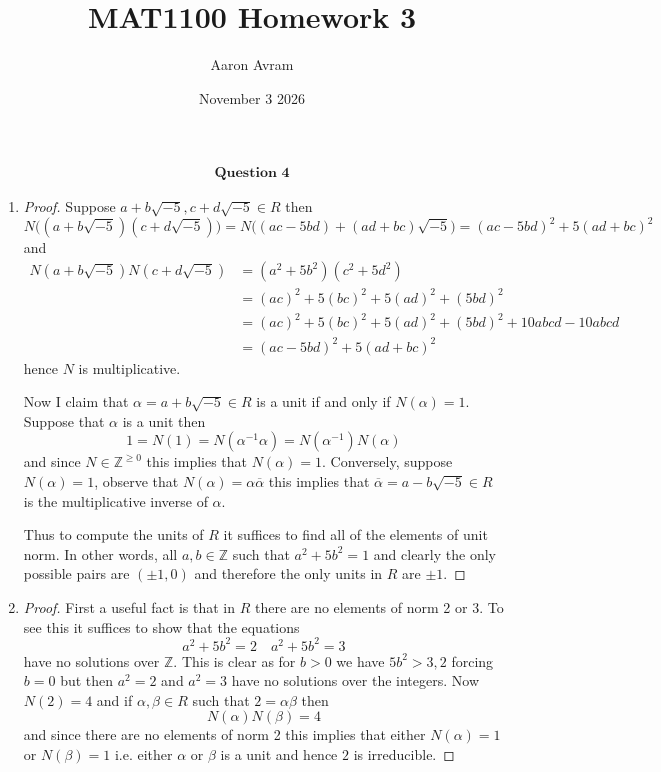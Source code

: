 \documentclass[12pt]{article}
\title{MAT1100 Homework 3}
\author{Aaron Avram}
\date{November 3 2026}
\begin{document}
\newtheorem{definition}{Definition}
\newtheorem{theorem}{Theorem}
\newtheorem{claim}{Claim}
\newtheorem{corollary}{Corollary}

\maketitle

\begin{align*}
    \textbf{Question 4}
\end{align*}

\begin{enumerate}
    \item[(a)]
    \begin{proof}
        Suppose $a + b\sqrt{-5}, c + d\sqrt{-5} \in R$ then
        \[ N\Big((a + b\sqrt{-5})(c + d\sqrt{-5})\Big) = N\Big((ac - 5bd) + (ad + bc)\sqrt{-5} \Big) = (ac - 5bd)^2 + 5(ad + bc)^2 \]
        and
        \begin{align*}
        N(a + b\sqrt{-5})N(c + d\sqrt{-5}) &= (a^2 + 5b^2)(c^2 + 5d^2) \\
        &= (ac)^2 + 5(bc)^2 + 5(ad)^2 + (5bd)^2 \\
        &= (ac)^2 + 5(bc)^2 + 5(ad)^2 + (5bd)^2 + 10abcd - 10abcd \\
        &= (ac -5bd)^2 + 5(ad + bc)^2
        \end{align*}
        hence $N$ is multiplicative.

        Now I claim that $\alpha = a + b\sqrt{-5} \in R$ is a unit if and only if $N(\alpha) = 1$.
        Suppose that $\alpha$ is a unit then
        \[ 1 = N(1) = N(\alpha^{-1}\alpha) = N(\alpha^{-1})N(\alpha) \]
        and since $N \in \mathbb Z^{\geq 0}$ this implies that $N(\alpha) = 1$.
        Conversely, suppose $N(\alpha) = 1$, observe that $N(\alpha) = \alpha\overline{\alpha}$
        this implies that $\overline{\alpha} = a - b\sqrt{-5} \in R$ is the multiplicative inverse of $\alpha$.

        Thus to compute the units of $R$ it suffices to find all of the elements of unit norm.
        In other words, all $a, b \in \mathbb Z$ such that $a^2 + 5b^2 = 1$ and clearly
        the only possible pairs are $(\pm 1, 0)$ and therefore the only units in $R$
        are $\pm 1$.
    \end{proof}

    \item[(b)]
    \begin{proof}
        First a useful fact is that in $R$ there are no elements of norm 2 or 3.
        To see this it suffices to show that the equations
        \[ a^2 + 5b^2 = 2 \quad a^2 + 5b^2 = 3 \]
        have no solutions over $\mathbb Z$. This is clear as for $b > 0$ we have
        $5b^2 > 3, 2$ forcing $b = 0$ but then $a^2 = 2$ and $a^2 = 3$ have no solutions over the integers.
        Now $N(2) = 4$ and if $\alpha, \beta \in R$ such that $2 = \alpha\beta$ then
        \[ N(\alpha)N(\beta) = 4 \]
        and since there are no elements of norm 2 this implies that either $N(\alpha) = 1$ or $N(\beta) = 1$
        i.e. either $\alpha$ or $\beta$ is a unit and hence $2$ is irreducible.


\end{proof}
\end{enumerate}
\end{document}
